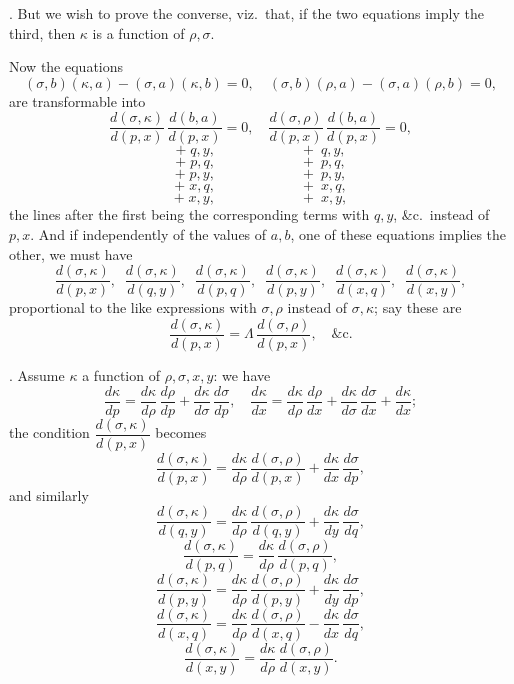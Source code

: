 \documentclass[11pt,a4paper]{article}
\begin{document}
\newpage


. But we wish to prove the converse, viz.\ that, if the two equations imply the third, then $\kappa$ is a function of $\rho, \sigma$.

Now the equations
\[
(\sigma, b)(\kappa, a) - (\sigma, a)(\kappa, b) = 0, \quad (\sigma, b)(\rho, a) - (\sigma, a)(\rho, b) = 0,
\]
are transformable into
\[
\frac{d(\sigma, \kappa)}{d(p, x)}\,\frac{d(b, a)}{d(p, x)} = 0, \quad \frac{d(\sigma, \rho)}{d(p, x)}\,\frac{d(b, a)}{d(p, x)} = 0,
\]
\[
+ \;q, y, \qquad\qquad\qquad +\;q, y,
\]
\[
+ \;p, q, \qquad\qquad\qquad +\;p, q,
\]
\[
+ \;p, y, \qquad\qquad\qquad +\;p, y,
\]
\[
+ \;x, q, \qquad\qquad\qquad +\;x, q,
\]
\[
+ \;x, y, \qquad\qquad\qquad +\;x, y,
\]
the lines after the first being the corresponding terms with $q, y$, \&c.\ instead of $p, x$.
And if independently of the values of $a, b$, one of these equations implies the other, we must have
\[
\frac{d(\sigma, \kappa)}{d(p, x)}, \;\; \frac{d(\sigma, \kappa)}{d(q, y)}, \;\; \frac{d(\sigma, \kappa)}{d(p, q)}, \;\; \frac{d(\sigma, \kappa)}{d(p, y)}, \;\; \frac{d(\sigma, \kappa)}{d(x, q)}, \;\; \frac{d(\sigma, \kappa)}{d(x, y)},
\]
proportional to the like expressions with $\sigma, \rho$ instead of $\sigma, \kappa$; say these are
\[
\frac{d(\sigma, \kappa)}{d(p, x)} = \Lambda\,\frac{d(\sigma, \rho)}{d(p, x)}, \quad \&\text{c.}
\]

\medskip

. Assume $\kappa$ a function of $\rho, \sigma, x, y$: we have
\[
\frac{d\kappa}{dp} = \frac{d\kappa}{d\rho}\,\frac{d\rho}{dp} + \frac{d\kappa}{d\sigma}\,\frac{d\sigma}{dp}, \quad \frac{d\kappa}{dx} = \frac{d\kappa}{d\rho}\,\frac{d\rho}{dx} + \frac{d\kappa}{d\sigma}\,\frac{d\sigma}{dx} + \frac{d\kappa}{dx};
\]
the condition $\dfrac{d(\sigma, \kappa)}{d(p, x)}$ becomes
\[
\frac{d(\sigma, \kappa)}{d(p, x)} = \frac{d\kappa}{d\rho}\,\frac{d(\sigma, \rho)}{d(p, x)} + \frac{d\kappa}{dx}\,\frac{d\sigma}{dp},
\]
and similarly
\[
\frac{d(\sigma, \kappa)}{d(q, y)} = \frac{d\kappa}{d\rho}\,\frac{d(\sigma, \rho)}{d(q, y)} + \frac{d\kappa}{dy}\,\frac{d\sigma}{dq},
\]
\[
\frac{d(\sigma, \kappa)}{d(p, q)} = \frac{d\kappa}{d\rho}\,\frac{d(\sigma, \rho)}{d(p, q)},
\]
\[
\frac{d(\sigma, \kappa)}{d(p, y)} = \frac{d\kappa}{d\rho}\,\frac{d(\sigma, \rho)}{d(p, y)} + \frac{d\kappa}{dy}\,\frac{d\sigma}{dp},
\]
\[
\frac{d(\sigma, \kappa)}{d(x, q)} = \frac{d\kappa}{d\rho}\,\frac{d(\sigma, \rho)}{d(x, q)} - \frac{d\kappa}{dx}\,\frac{d\sigma}{dq},
\]
\[
\frac{d(\sigma, \kappa)}{d(x, y)} = \frac{d\kappa}{d\rho}\,\frac{d(\sigma, \rho)}{d(x, y)}.
\]
\end{document}
